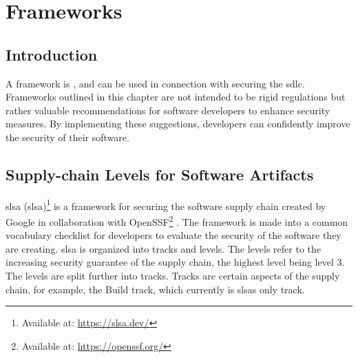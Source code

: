 \newpage
\section{Frameworks}
\label{frameworks}
\subsection{Introduction}
A framework is \textit{} \cite{FrameworkDefinition}, and can be used in connection with securing the \acrshort{sdlc}. Frameworks outlined in this chapter are not intended to be rigid regulations but rather valuable recommendations for software developers to enhance security measures. By implementing these suggestions, developers can confidently improve the security of their software.

\subsection{Supply-chain Levels for Software Artifacts}
\label{Supply-chainLevelsforSoftwareArtifacts}
\acrlong{slsa} (\acrshort{slsa})\footnote{Available at: \url{https://slsa.dev/}} is a framework for securing the software supply chain created by Google in collaboration with OpenSSF\footnote{Available at: \url{https://openssf.org/}} \cite{SLSAgeneral}. The framework is made into a common vocabulary checklist for developers to evaluate the security of the software they are creating. \acrshort{slsa} is organized into tracks and levels. The levels refer to the increasing security guarantee of the supply chain, the highest level being level 3. The levels are split further into tracks. Tracks are certain aspects of the supply chain, for example, the Build track, which currently is \acrshort{slsa}s only track. 

